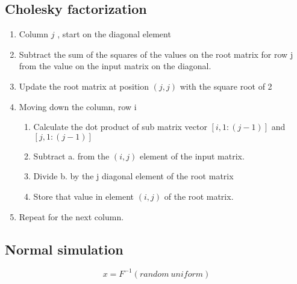 \documentclass{gji}
\begin{document}
\subsection{Cholesky factorization}
\begin{enumerate}
  \item Column $j$ , start on the diagonal element
  \item Subtract the sum of the squares of the values on the root matrix for row j from the value
        on the input matrix on the diagonal.
  \item Update the root matrix at position $(j,j)$ with the square root of 2
  \item Moving down the column, row i
  \begin{enumerate}  
    \item Calculate the dot product of sub matrix vector $[i, 1:(j-1)]$ and $[j, 1:(j-1)]$
    \item Subtract a. from the $(i,j)$ element of the input matrix.
    \item Divide b. by the j diagonal element of the root matrix
    \item Store that value in element $(i,j)$ of the root matrix.
  \end{enumerate}
  \item Repeat for the next column.
\end{enumerate}

\hspace{-1.2cm}

\subsection{Normal simulation}
\begin{equation}
  x = F^{-1}(random\ uniform)
\end{equation}
\end{document}

